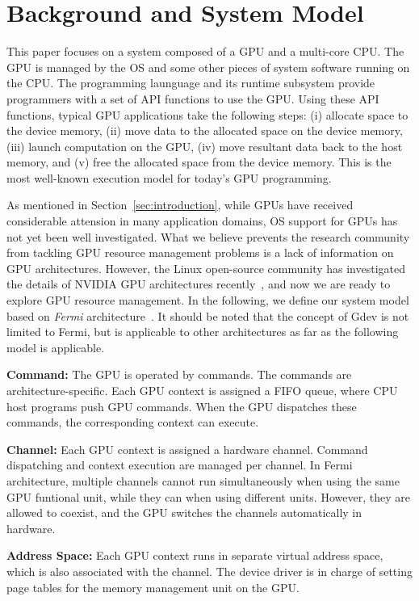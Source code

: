 \section{Background and System Model}
\label{sec:model}

This paper focuses on a system composed of a GPU and a multi-core CPU.
The GPU is managed by the OS and some other pieces of system software
running on the CPU.
The programming launguage and its runtime subsystem provide programmers
with a set of API functions to use the GPU.
Using these API functions, typical GPU applications take the following
steps: (i) allocate space to the device memory, (ii) move data to the
allocated space on the device memory, (iii) launch computation on the
GPU, (iv) move resultant data back to the host memory, and (v) free the
allocated space from the device memory.
This is the most well-known execution model for today's GPU
programming.

As mentioned in Section~\ref{sec:introduction}, while GPUs have received
considerable attension in many application domains, OS support for GPUs
has not yet been well investigated.
What we believe prevents the research community from tackling GPU
resource management problems is a lack of information on GPU
architectures.
However, the Linux open-source community has investigated the details
of NVIDIA GPU architectures recently~\cite{envytools}, and now we are
ready to explore GPU resource management.
In the following, we define our system model based on \textit{Fermi}
architecture~\cite{Fermi}.
It should be noted that the concept of Gdev is not limited to Fermi, but
is applicable to other architectures as far as the following model is
applicable.

\textbf{Command:}
The GPU is operated by commands.
The commands are architecture-specific.
Each GPU context is assigned a FIFO queue, where CPU host programs push
GPU commands.
When the GPU dispatches these commands, the corresponding context can
execute. 

\textbf{Channel:}
Each GPU context is assigned a hardware channel.
Command dispatching and context execution are managed per channel.
In Fermi architecture, multiple channels cannot run simultaneously when
using the same GPU funtional unit, while they can when using different
units.
However, they are allowed to coexist, and the GPU switches the channels
automatically in hardware.

\textbf{Address Space:}
Each GPU context runs in separate virtual address space, which is also
associated with the channel.
The device driver is in charge of setting page tables for the memory
management unit on the GPU.

